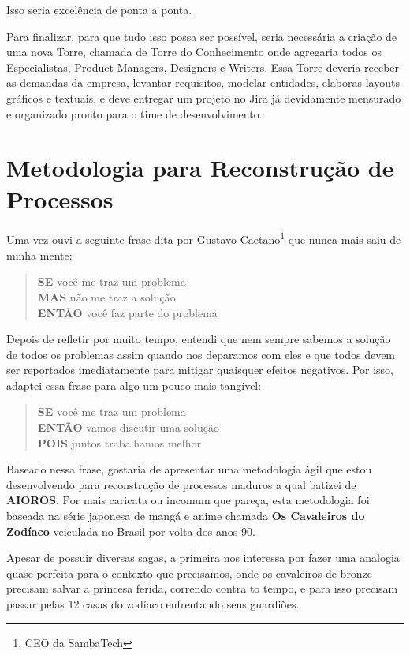 \documentclass[a4paper]{article}
\begin{document}
Isso seria excelência de ponta a ponta.

Para finalizar, para que tudo isso possa ser possível, seria necessária a criação de uma nova Torre, chamada de Torre do Conhecimento onde agregaria todos os Especialistas, Product Managers, Designers e Writers.
Essa Torre deveria receber as demandas da empresa, levantar requisitos, modelar entidades, elaboras layouts gráficos e textuais, e deve entregar um projeto no Jira já devidamente mensurado e organizado pronto para o time de desenvolvimento.

\section{Metodologia para Reconstrução de Processos}

Uma vez ouvi a seguinte frase dita por Gustavo Caetano\footnote{CEO da SambaTech} que nunca mais saiu de minha mente:
\begin{quote}
    \textbf{SE} você me traz um problema \\
    \textbf{MAS} não me traz a solução \\
    \textbf{ENTÃO} você faz parte do problema
\end{quote}

Depois de refletir por muito tempo, entendi que nem sempre sabemos a solução de todos os problemas assim quando nos deparamos com eles e que  todos devem ser reportados imediatamente para mitigar quaisquer efeitos negativos. Por isso, adaptei essa frase para algo um pouco mais tangível:
\begin{quote}
    \textbf{SE} você me traz um problema \\
    \textbf{ENTÃO} vamos discutir uma solução \\
    \textbf{POIS} juntos trabalhamos melhor
\end{quote}

Baseado nessa frase, gostaria de apresentar uma metodologia ágil que estou desenvolvendo para reconstrução de processos maduros a qual batizei de \textbf{AIOROS}. Por mais caricata ou incomum que pareça, esta metodologia foi baseada na série japonesa de mangá e anime chamada \textbf{Os Cavaleiros do Zodíaco} veiculada no Brasil por volta dos anos 90.

Apesar de possuir diversas sagas, a primeira nos interessa por fazer uma analogia quase perfeita para o contexto que precisamos, onde os cavaleiros de bronze precisam salvar a princesa ferida, correndo contra to tempo, e para isso precisam passar pelas 12 casas do zodíaco enfrentando seus guardiões.
\end{document}
